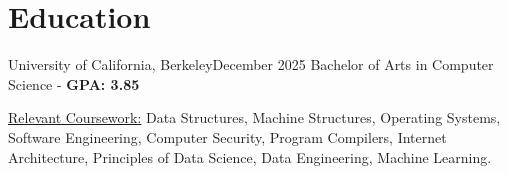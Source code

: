 \section{Education}
    \resumeSubHeadingListStart
    \resumeSubheading
    {University of California, Berkeley}{December 2025}
    {Bachelor of Arts in Computer Science - \textbf{GPA: 3.85}}{}
    \begin{itemize}[leftmargin=0.12in,label={}]
    \small{\item{
        \underline{Relevant Coursework:}{ 
            Data Structures,
            Machine Structures,
            Operating Systems,
            Software Engineering,
            Computer Security,
            Program Compilers,
            Internet Architecture,
            Principles of Data Science,
            Data Engineering,
            Machine Learning.
        }
    }}
    \end{itemize}
    \vspace{-5pt}  %
    \resumeSubHeadingListEnd